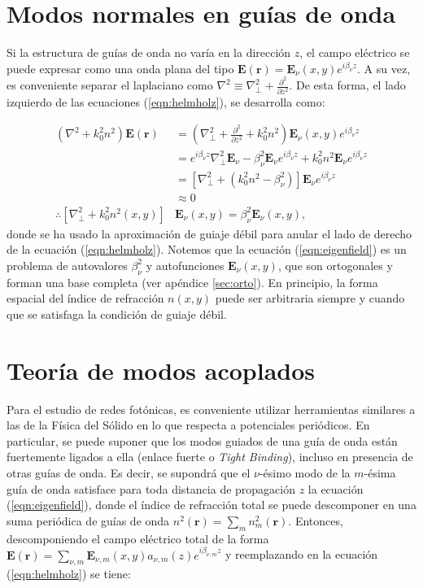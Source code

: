 \section{Modos normales en guías de onda}

Si la estructura de guías de onda no varía en la dirección $z$, el campo eléctrico se puede expresar como una onda plana del tipo $\textbf{E}(\textbf{r}) = \textbf{E}_\nu(x, y) e^{i\beta_\nu z}$. A su vez, es conveniente separar el laplaciano como $\nabla^2 \equiv \nabla_\perp^2 + \frac{\partial^2}{\partial z^2}$. De esta forma, el lado izquierdo de las ecuaciones (\ref{eqn:helmholz}), se desarrolla como:

\begin{align}
	(\nabla^2  + k_0^2n^2) \textbf{E}(\textbf{r}) &= \left(\nabla_\perp^2 + \frac{\partial^2}{\partial z^2} + k_0^2n^2\right) \textbf{E}_\nu(x, y)  e^{i\beta_\nu z} \nonumber
\\	
	&= e^{i\beta_\nu z} \nabla_\perp^2 \textbf{E}_\nu -\beta_\nu^2\textbf{E}_\nu e^{i\beta_\nu z} + k_0^2n^2 \textbf{E}_\nu  e^{i\beta_\nu z}
\nonumber	
	\\	
	&= \left[  \nabla_\perp^2  + (k_0^2n^2-\beta_\nu^2) \right]\textbf{E}_\nu  e^{i\beta_\nu z}
	\nonumber	
	\\
	&\approx
	0
	\nonumber
	\\
	\therefore
	 \left[  \nabla_\perp^2  + k_0^2n^2(x,y) \right]&\textbf{E}_\nu(x,y)  = \beta_\nu^2 \textbf{E}_\nu(x,y), \label{eqn:eigenfield}
\end{align}
donde se ha usado la aproximación de guiaje débil para anular el lado de derecho de la ecuación (\ref{eqn:helmholz}). Notemos que la ecuación (\ref{eqn:eigenfield}) es un problema de autovalores $\beta_\nu^2$ y autofunciones $\textbf{E}_\nu(x,y)$, que son ortogonales y forman una base completa (ver apéndice \ref{sec:orto}). En principio, la forma espacial del índice de refracción $n(x, y)$ puede ser arbitraria siempre y cuando que se satisfaga la condición de guiaje débil. 

\section{Teoría de modos acoplados}
	Para el estudio de redes fotónicas, es conveniente utilizar herramientas similares a las de la Física del Sólido en lo que respecta a potenciales periódicos. En particular, se puede suponer que los modos guiados de una guía de onda están fuertemente ligados a ella (enlace fuerte o \textit{Tight Binding}), incluso en presencia de otras guías de onda. Es decir, se supondrá que el $\nu$-ésimo modo de la $m$-ésima guía de onda satisface para toda distancia de propagación $z$ la ecuación (\ref{eqn:eigenfield}), donde el índice de refracción total se puede descomponer en una suma periódica de guías de onda $n^2(\textbf{r}) = \sum_{m} n^2_m(\textbf{r})$. Entonces, descomponiendo el campo eléctrico total de la forma $\textbf{E}(\textbf{r}) = \sum_{\nu, m} \textbf{E}_{\nu, m}(x, y) a_{\nu, m}(z) e^{i\beta_{\nu, m} z}$ y reemplazando en la ecuación (\ref{eqn:helmholz}) se tiene:

